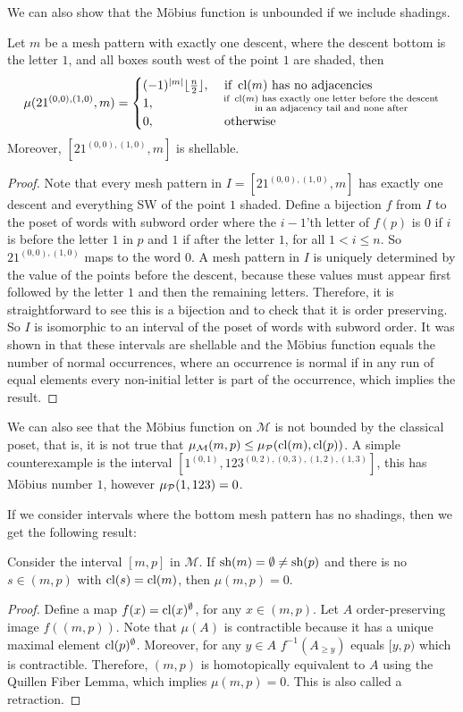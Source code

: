 \documentclass[11pt,a4paper,oneside]{article}
\begin{document}
We can also show that the M\"obius function is unbounded if we include shadings.
\begin{lem}\label{lem:mobUn}
Let $m$ be a mesh pattern with exactly one descent, where the descent bottom is
the letter $1$, and all boxes south west of the point $1$ are shaded, then
$$
\mu(21^{(0,0),(1,0)},m)=\begin{cases}
(-1)^{|m|}\lfloor\frac{n}{2}\rfloor,&\mbox{ if } \operatorname{\textrm{cl}}(m) \mbox{ has no adjacencies}\\
1,&\substack{ \text{ if } \operatorname{\textrm{cl}}(m) \text{ has exactly one letter before the descent} \\
\text{ in an adjacency tail and none after}}\\
0, &\mbox{ otherwise}
\end{cases}
$$
Moreover, $[21^{(0,0),(1,0)},m]$ is shellable.
\begin{proof}
Note that every mesh pattern in $I=[21^{(0,0),(1,0)},m]$ has exactly one descent
and everything SW of the point $1$ shaded. Define a bijection $f$ from $I$ to
the poset of words with subword order where the $i-1$'th letter of $f(p)$ is $0$
if $i$ is before the letter $1$ in $p$ and $1$ if after the letter $1$, for all
$1<i\le n$. So $21^{(0,0),(1,0)}$ maps to the word $0$. A mesh pattern in $I$ is
uniquely determined by the value of the points before the descent, because these
values must appear first followed by the letter $1$ and then the remaining
letters. Therefore, it is straightforward to see this is a bijection and to
check that it is order preserving. So $I$ is isomorphic to an interval of the
poset of words with subword order. It was shown in \cite{Bjo90} that these
intervals are shellable and the M\"obius function equals the number of normal
occurrences, where an occurrence is normal if in any run of equal elements every
non-initial letter is part of the occurrence, which implies the result.
\end{proof}
\end{lem}

We can also see that the M\"obius function on $\mathcal{M}$ is not bounded by
the classical poset, that is, it is not true that $\operatorname{\mu_\mathcal{M}}(m,p)\le
\operatorname{\mu_\mathcal{P}}(\operatorname{\textrm{cl}}(m),\operatorname{\textrm{cl}}(p))$. A simple counterexample is the interval
$[1^{(0,1)},123^{(0,2),(0,3),(1,2),(1,3)}]$, this has M\"obius number $1$,
however $\operatorname{\mu_\mathcal{P}}(1,123)=0$.

If we consider intervals where the bottom mesh pattern has no shadings, then we
get the following result:
\begin{lem}\label{lem:mu0}
Consider the interval $[m,p]$ in $\mathcal{M}$. If $\operatorname{\textrm{sh}}(m)=\emptyset\not=\operatorname{\textrm{sh}}(p)$
and there is no $s\in(m,p)$ with $\operatorname{\textrm{cl}}(s)=\operatorname{\textrm{cl}}(m)$, then $\mu(m,p)=0$.
\begin{proof}
Define a map $f(x)=\operatorname{\textrm{cl}}(x)^\emptyset$, for any $x\in(m,p)$. Let $A$
order-preserving image $f((m,p))$. Note that $\mu(A)$ is contractible because it has a
unique maximal element $\operatorname{\textrm{cl}}(p)^\emptyset$. Moreover, for any $y\in A$ $f^{-1}(A_{\ge y})$
equals $[y,p)$ which is contractible. Therefore, $(m,p)$ is homotopically equivalent
to $A$ using the Quillen Fiber Lemma, which implies $\mu(m,p)=0$. This is also called a retraction.
\end{proof}
\end{lem}
\end{document}
